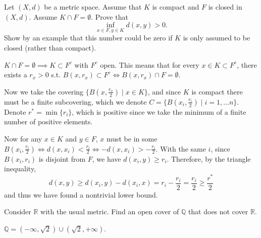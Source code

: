   \begin{exercise}
    Let $(X,d)$ be a metric space. Assume that $K$ is compact and $F$ is closed 
    in $(X,d)$. Assume $K \cap F = \emptyset$. Prove that
    \begin{equation}
      \inf_{x \in F, y \in K} d(x,y) > 0.
    \end{equation}
    Show by an example that this number could be zero if $K$ is only assumed 
    to be closed (rather than compact).
  \end{exercise}
  \begin{solution}
    $K \cap F = \emptyset \implies K \subset F^c$ with $F^c$ open. This means that for every $x \in K \subset F^c$, there exists a $r_x > 0$ s.t. $B(x, r_x) \subset F^c \iff B(x, r_x) \cap F = \emptyset$. 

    Now we take the covering $\{B(x, \frac{r_x}{2}) \mid x \in K\}$, and since $K$ is compact there must be a finite subcovering, which we denote $C = \{B(x_i, \frac{r_i}{2}) \mid i = 1, \ldots n \}$. Denote $r^\ast = \min\{r_i\}$, which is positive since we take the minimum of a finite number of positive elements. 

    Now for any $x \in K$ and $y \in F$, $x$ must be in some $B(x_i, \frac{r_i}{2}) \iff d(x, x_i) < \frac{r_i}{2} \iff -d(x, x_i) > - \frac{r_i}{2}$. With the same $i$, since $B(x_i, r_i)$ is disjoint from $F$, we have $d(x_i, y) \geq r_i$. Therefore, by the triangle inequality, 
    \begin{equation}
      d(x, y) \geq d(x_i, y) - d(x_i, x) = r_i - \frac{r_i}{2} = \frac{r_i}{2} \geq \frac{r^\ast}{2}
    \end{equation}
    and thus we have found a nontrivial lower bound. 
  \end{solution}

  \begin{exercise}
    Consider $\mathbb{R}$ with the usual metric. Find an open cover of $\mathbb{Q}$ that does not 
    cover $\mathbb{R}$.
  \end{exercise}
  \begin{solution}
    $\mathbb{Q} = (-\infty, \sqrt{2}) \cup (\sqrt{2}, +\infty)$. 
  \end{solution}

